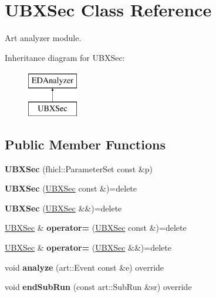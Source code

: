 \hypertarget{classUBXSec}{\section{U\-B\-X\-Sec Class Reference}
\label{classUBXSec}
}


Art analyzer module.  


Inheritance diagram for U\-B\-X\-Sec\-:\begin{figure}[H]
\begin{center}
\leavevmode
\includegraphics[height=2.000000cm]{classUBXSec}
\end{center}
\end{figure}
\subsection*{Public Member Functions}
\begin{DoxyCompactItemize}
\item 
\hypertarget{classUBXSec_a002d19d94378dc90587c10bd4b498c4b}{{\bfseries U\-B\-X\-Sec} (fhicl\-::\-Parameter\-Set const \&p)}\label{classUBXSec_a002d19d94378dc90587c10bd4b498c4b}

\item 
\hypertarget{classUBXSec_a7605dc6971daa3828fc2cc98b118ad35}{{\bfseries U\-B\-X\-Sec} (\hyperlink{classUBXSec}{U\-B\-X\-Sec} const \&)=delete}\label{classUBXSec_a7605dc6971daa3828fc2cc98b118ad35}

\item 
\hypertarget{classUBXSec_ac34a81c60372754002552bff0c9a2764}{{\bfseries U\-B\-X\-Sec} (\hyperlink{classUBXSec}{U\-B\-X\-Sec} \&\&)=delete}\label{classUBXSec_ac34a81c60372754002552bff0c9a2764}

\item 
\hypertarget{classUBXSec_a77d35a5e1f8ddd85190e0c78bb125229}{\hyperlink{classUBXSec}{U\-B\-X\-Sec} \& {\bfseries operator=} (\hyperlink{classUBXSec}{U\-B\-X\-Sec} const \&)=delete}\label{classUBXSec_a77d35a5e1f8ddd85190e0c78bb125229}

\item 
\hypertarget{classUBXSec_aa8449ecf97b4c738a60b714dd0ea181e}{\hyperlink{classUBXSec}{U\-B\-X\-Sec} \& {\bfseries operator=} (\hyperlink{classUBXSec}{U\-B\-X\-Sec} \&\&)=delete}\label{classUBXSec_aa8449ecf97b4c738a60b714dd0ea181e}

\item 
\hypertarget{classUBXSec_a30a2981a63a32be7d7b8819bb462e859}{void {\bfseries analyze} (art\-::\-Event const \&e) override}\label{classUBXSec_a30a2981a63a32be7d7b8819bb462e859}

\item 
\hypertarget{classUBXSec_a7cc3686ca5cb1a620bf8b5bba0987bf9}{void {\bfseries end\-Sub\-Run} (const art\-::\-Sub\-Run \&sr) override}\label{classUBXSec_a7cc3686ca5cb1a620bf8b5bba0987bf9}

\end{DoxyCompactItemize}


